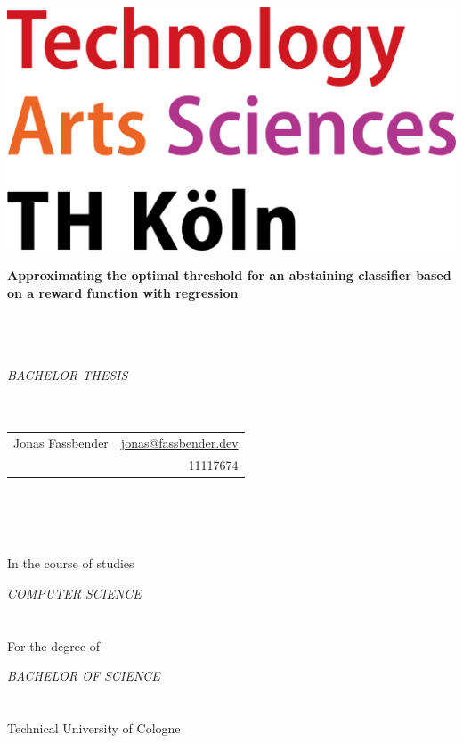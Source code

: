 \documentclass[twoside,11pt]{article}
\begin{document}
\begin{titlepage}
  \begin{flushleft}
	\vspace*{-1cm}
	\includegraphics[scale=0.05]{TH.png}\\
	\vspace*{1cm}
\end{flushleft}
\begin{center}
\begin{LARGE}
\textbf{%
	Approximating the optimal threshold for an abstaining
  classifier based on a reward function with regression
}
\end{LARGE}
~\\
~\\
~\\
\textit{{\LARGE B}ACHELOR {\LARGE T}HESIS}
~\\
~\\
~\\
\begin{Large}
\begin{tabu} to \textwidth {Xr}
Jonas Fassbender
&\href{mailto:jonas@fassbender.dev}{jonas@fassbender.dev}\\
&11117674
\end{tabu}
\end{Large}
~\\
~\\
~\\
\begin{large}
In the course of studies

\textit{{\Large C}OMPUTER {\Large S}CIENCE}
~\\
~\\
~\\
For the degree of

\textit{{\Large B}ACHELOR OF {\Large S}CIENCE}
~\\
~\\
~\\
Technical University of Cologne


\end{large}
\end{center}
\end{titlepage}
\end{document}
